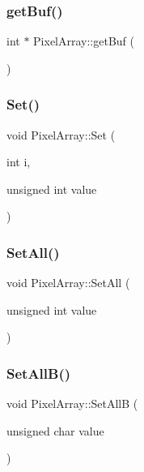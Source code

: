 \subsubsection{\texorpdfstring{get\+Buf()}{getBuf()}}
{\footnotesize\ttfamily int $\ast$ Pixel\+Array\+::get\+Buf (\begin{DoxyParamCaption}{ }\end{DoxyParamCaption})}

\mbox{\label{class_pixel_array_afcfe32b74beeced27f928f42131d77c1}} 
\subsubsection{\texorpdfstring{Set()}{Set()}}
{\footnotesize\ttfamily void Pixel\+Array\+::\+Set (\begin{DoxyParamCaption}\item[{int}]{i,  }\item[{unsigned int}]{value }\end{DoxyParamCaption})}

\mbox{\label{class_pixel_array_a5f560dcef3d1582614858969b20da89d}} 
\subsubsection{\texorpdfstring{Set\+All()}{SetAll()}}
{\footnotesize\ttfamily void Pixel\+Array\+::\+Set\+All (\begin{DoxyParamCaption}\item[{unsigned int}]{value }\end{DoxyParamCaption})}

\mbox{\label{class_pixel_array_a3b17271fdc21503236ca6ca8e37d501b}} 
\subsubsection{\texorpdfstring{Set\+All\+B()}{SetAllB()}}
{\footnotesize\ttfamily void Pixel\+Array\+::\+Set\+AllB (\begin{DoxyParamCaption}\item[{unsigned char}]{value }\end{DoxyParamCaption})}

